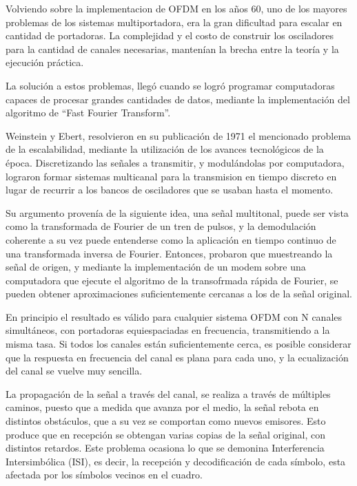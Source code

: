 Volviendo sobre la implementacion de OFDM en los años 60, uno de los mayores problemas de los sistemas multiportadora, era la gran dificultad para escalar en cantidad de portadoras. La complejidad y el costo de construir los osciladores para la cantidad de canales necesarias, mantenían la brecha entre la teoría y la ejecución práctica. 

La solución a estos problemas, llegó cuando se logró programar computadoras capaces de procesar grandes cantidades de datos, mediante la implementación del algoritmo de “Fast Fourier Transform”. 

Weinstein y Ebert, resolvieron en  su publicación de 1971 \cite{discrete-ofdm} el mencionado problema de la escalabilidad, mediante la utilización de los avances tecnológicos de la época. Discretizando las señales a transmitir, y modulándolas por computadora, lograron formar sistemas multicanal para la transmision en tiempo discreto en lugar de recurrir a los bancos de osciladores que se usaban hasta el momento. 

Su argumento provenía de la siguiente idea, una señal multitonal, puede ser vista como la transformada de Fourier de un tren de pulsos, y la demodulación coherente a su vez puede entenderse como la aplicación en tiempo continuo de una transformada inversa de Fourier. Entonces, probaron que muestreando la señal de origen, y mediante la implementación de un modem sobre una computadora que ejecute el algoritmo de la transofrmada rápida de Fourier, se pueden obtener aproximaciones suficientemente cercanas a los de la señal original. 

En principio el resultado es válido para cualquier sistema OFDM con N canales simultáneos, con portadoras equiespaciadas en frecuencia, transmitiendo a la misma tasa. Si todos los canales están suficientemente cerca, es posible considerar que la respuesta en frecuencia del canal es plana para cada uno, y la ecualización del canal se vuelve muy sencilla.

La propagación de la señal a través del canal, se realiza a través de múltiples caminos, puesto que a medida que avanza por el medio, la señal rebota en distintos obstáculos, que a su vez se comportan como nuevos emisores. Esto produce que en recepción se obtengan varias copias de la señal original, con distintos retardos. Este problema ocasiona lo que se demonina Interferencia Intersimbólica (ISI), es decir, la recepción y decodificación de cada símbolo, esta afectada por los símbolos vecinos en el cuadro.

